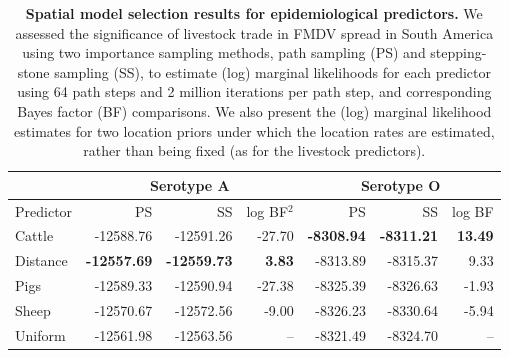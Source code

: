 \documentclass[10pt]{article}
\begin{document}
\newpage
\begin{table}[H]
\caption{
\textbf{Spatial model selection results for epidemiological predictors.}
We assessed the significance of livestock trade in FMDV spread in South America using two importance sampling methods,  path sampling (PS) and stepping-stone sampling (SS), to estimate (log) marginal likelihoods for each predictor using 64 path steps and 2 million iterations per path step, and corresponding Bayes factor (BF) comparisons.
We also present the (log) marginal likelihood estimates for two location priors under which the location rates are estimated, rather than being fixed (as for the livestock predictors).
}
\begin{center}
\begin{tabular}{lrrrrrr}
\toprule
 & \multicolumn{3}{c}{Serotype A}& \multicolumn{3}{c}{Serotype O}\\
 \midrule
Predictor & PS & SS & log BF$^2$ & PS & SS & log BF \\
Cattle&-12588.76&-12591.26&-27.70&\textbf{-8308.94}&\textbf{-8311.21}& \textbf{13.49}\\
Distance&\textbf{-12557.69}&\textbf{-12559.73}&\textbf{3.83}&-8313.89&-8315.37&9.33\\
Pigs&-12589.33&-12590.94&-27.38&-8325.39&-8326.63&-1.93\\
Sheep&-12570.67&-12572.56&-9.00&-8326.23&-8330.64&-5.94\\
Uniform&-12561.98&-12563.56&--&-8321.49&-8324.70&--\\
\bottomrule
\end{tabular}
\end{center}
\begin{flushleft}
\end{flushleft}
\label{tab:preds}
 \end{table}
\newpage
\end{document}
